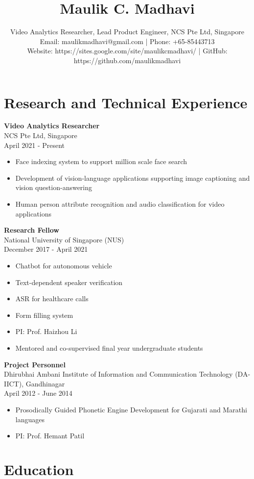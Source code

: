 \documentclass[10pt]{article}
\title{\textbf{\Large Maulik C. Madhavi}}
\author{Video Analytics Researcher, Lead Product Engineer, NCS Pte Ltd, Singapore \\
Email: maulikmadhavi@gmail.com | Phone: +65-85443713 \\
Website: https://sites.google.com/site/maulikcmadhavi/ | GitHub: https://github.com/maulikmadhavi}
\date{}
\begin{document}
\maketitle

\section*{Research and Technical Experience}

\noindent\textbf{Video Analytics Researcher} \\
NCS Pte Ltd, Singapore \\
April 2021 - Present
\begin{itemize}
\item Face indexing system to support million scale face search
\item Development of vision-language applications supporting image captioning and vision question-answering
\item Human person attribute recognition and audio classification for video applications
\end{itemize}

\noindent\textbf{Research Fellow} \\
National University of Singapore (NUS) \\
December 2017 - April 2021
\begin{itemize}
\item Chatbot for autonomous vehicle
\item Text-dependent speaker verification
\item ASR for healthcare calls
\item Form filling system
\item PI: Prof. Haizhou Li
\item Mentored and co-supervised final year undergraduate students
\end{itemize}

\noindent\textbf{Project Personnel} \\
Dhirubhai Ambani Institute of Information and Communication Technology (DA-IICT), Gandhinagar \\
April 2012 - June 2014
\begin{itemize}
\item Prosodically Guided Phonetic Engine Development for Gujarati and Marathi languages
\item PI: Prof. Hemant Patil
\end{itemize}

\section*{Education}
\end{document}
